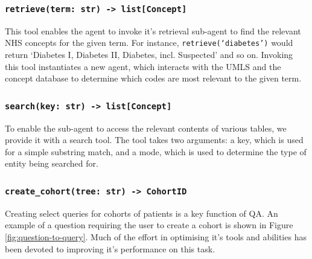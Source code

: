 \documentclass[11pt]{article}
\begin{document}
\subsubsection*{\texttt{retrieve(term: str) -> list[Concept]}}
This tool enables the agent to invoke it's retrieval sub-agent to find the relevant NHS concepts for the given term.
For instance, \texttt{retrieve(`diabetes')} would return `Diabetes I, Diabetes II, Diabetes, incl. Suspected' and so on.
Invoking this tool instantiates a new agent, which interacts with the UMLS and the concept database to determine which codes are most relevant to the given term.

\subsubsection*{\texttt{search(key: str) -> list[Concept]}}
To enable the sub-agent to access the relevant contents of various tables, we provide it with a search tool.
The tool takes two arguments: a key, which is used for a simple substring match, and a mode, which is used to determine the type of entity being searched
for.

\subsubsection*{\texttt{create\_cohort(tree: str) -> CohortID}}
Creating select queries for cohorts of patients is a key function of QA.
An example of a question requiring the user to create a cohort is shown in Figure \ref{fig:question-to-query}.
Much of the effort in optimising it's tools and abilities has been devoted to improving it's performance on this task.






\end{document}
